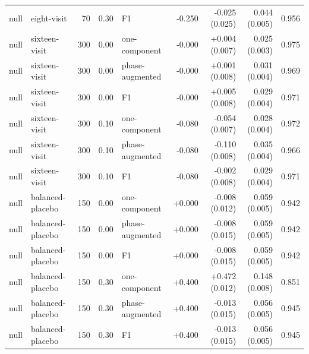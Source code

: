 \documentclass[
  11pt,
]{article}
\begin{document}
\begin{longtable}[t]{llrrlrrrr}
null & eight-visit & 70 & 0.30 & F1 & -0.250 & -0.025 (0.025) & 0.044 (0.005) & 0.956\\
null & sixteen-visit & 300 & 0.00 & one-component & -0.000 & +0.004 (0.007) & 0.025 (0.003) & 0.975\\
null & sixteen-visit & 300 & 0.00 & phase-augmented & -0.000 & +0.001 (0.008) & 0.031 (0.004) & 0.969\\
null & sixteen-visit & 300 & 0.00 & F1 & -0.000 & +0.005 (0.008) & 0.029 (0.004) & 0.971\\
\addlinespace
null & sixteen-visit & 300 & 0.10 & one-component & -0.080 & -0.054 (0.007) & 0.028 (0.004) & 0.972\\
null & sixteen-visit & 300 & 0.10 & phase-augmented & -0.080 & -0.110 (0.008) & 0.035 (0.004) & 0.966\\
null & sixteen-visit & 300 & 0.10 & F1 & -0.080 & -0.002 (0.008) & 0.029 (0.004) & 0.971\\
null & balanced-placebo & 150 & 0.00 & one-component & +0.000 & -0.008 (0.012) & 0.059 (0.005) & 0.942\\
null & balanced-placebo & 150 & 0.00 & phase-augmented & +0.000 & -0.008 (0.015) & 0.059 (0.005) & 0.942\\
\addlinespace
null & balanced-placebo & 150 & 0.00 & F1 & +0.000 & -0.008 (0.015) & 0.059 (0.005) & 0.942\\
null & balanced-placebo & 150 & 0.30 & one-component & +0.400 & +0.472 (0.012) & 0.148 (0.008) & 0.851\\
null & balanced-placebo & 150 & 0.30 & phase-augmented & +0.400 & -0.013 (0.015) & 0.056 (0.005) & 0.945\\
null & balanced-placebo & 150 & 0.30 & F1 & +0.400 & -0.013 (0.015) & 0.056 (0.005) & 0.945\\
\bottomrule
\end{longtable}
\endgroup{}
\end{document}
